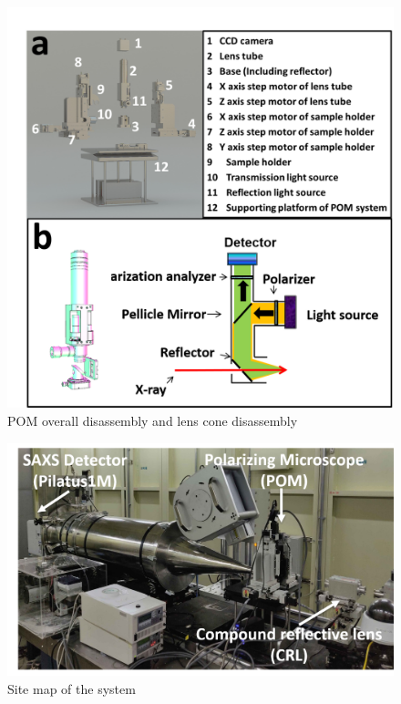 \begin{figure}
    \centering
    \includegraphics[scale=0.5]{Figures/Fig3POM.png}
    \caption{POM overall disassembly and lens cone disassembly}
    \label{POM}
\end{figure}


\begin{figure}
    \centering
    \includegraphics[scale=0.5]{Figures/Fig4SiteMap.png}
    \caption{Site map of the system}
    \label{sitemap}
\end{figure}


